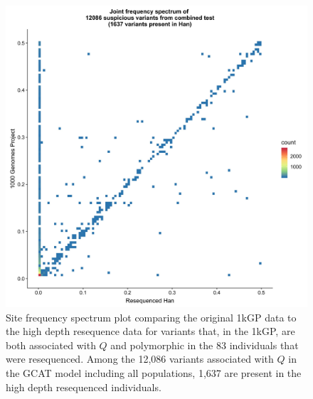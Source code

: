 \documentclass[9pt,lineno]{elife}
\begin{document}
\begin{figure}[h]
\centering
\includegraphics[width=12cm,keepaspectratio]{./Figures/Han_1kGP_SFS_FullModel.jpg}
\caption{Site frequency spectrum plot comparing the original 1kGP data to the high depth resequence data for variants that, in the 1kGP, are both associated with $Q$ and polymorphic in the 83 individuals that were resequenced.
Among the 12,086 variants associated with $Q$ in the GCAT model including all populations, 1,637 are present in the high depth resequenced individuals.}  
\label{90HanSFS_30}
\end{figure}
\end{document}
